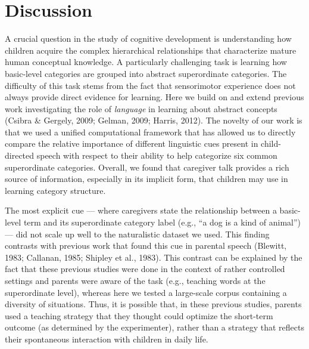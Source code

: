 \documentclass[english,,man,floatsintext]{apa6}
\begin{document}
\hypertarget{discussion}{%
\section{Discussion}\label{discussion}}

A crucial question in the study of cognitive development is understanding how children acquire the complex hierarchical relationships that characterize mature human conceptual knowledge. A particularly challenging task is learning how basic-level categories are grouped into abstract superordinate categories. The difficulty of this task stems from the fact that sensorimotor experience does not always provide direct evidence for learning. Here we build on and extend previous work investigating the role of \emph{language} in learning about abstract concepts (Csibra \& Gergely, 2009; Gelman, 2009; Harris, 2012). The novelty of our work is that we used a unified computational framework that has allowed us to directly compare the relative importance of different linguistic cues present in child-directed speech with respect to their ability to help categorize six common superordinate categories. Overall, we found that caregiver talk provides a rich source of information, especially in its implicit form, that children may use in learning category structure.

The most explicit cue --- where caregivers state the relationship between a basic-level term and its superordinate category label (e.g., \enquote{a dog is a kind of animal}) --- did not scale up well to the naturalistic dataset we used. This finding contrasts with previous work that found this cue in parental speech (Blewitt, 1983; Callanan, 1985; Shipley et al., 1983). This contrast can be explained by the fact that these previous studies were done in the context of rather controlled settings and parents were aware of the task (e.g., teaching words at the superordinate level), whereas here we tested a large-scale corpus containing a diversity of situations. Thus, it is possible that, in these previous studies, parents used a teaching strategy that they thought could optimize the short-term outcome (as determined by the experimenter), rather than a strategy that reflects their spontaneous interaction with children in daily life.
\end{document}
